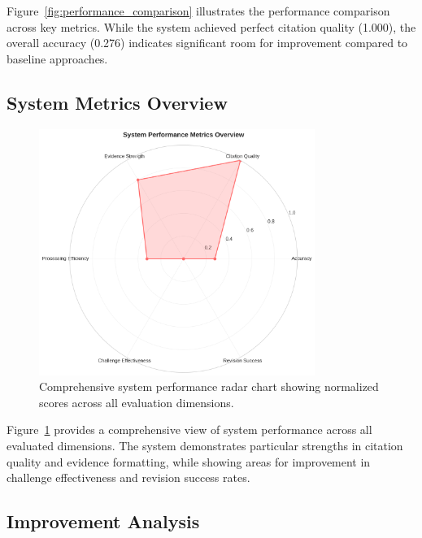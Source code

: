 \documentclass{article}
\begin{document}
Figure~\ref{fig:performance_comparison} illustrates the performance comparison across key metrics. While the system achieved perfect citation quality (1.000), the overall accuracy (0.276) indicates significant room for improvement compared to baseline approaches.

\subsection{System Metrics Overview}

\begin{figure}[htbp]
\centering
\includegraphics[width=0.8\textwidth]{figures/metrics_radar.png}
\caption{Comprehensive system performance radar chart showing normalized scores across all evaluation dimensions.}
\label{fig:metrics_radar}
\end{figure}

Figure~\ref{fig:metrics_radar} provides a comprehensive view of system performance across all evaluated dimensions. The system demonstrates particular strengths in citation quality and evidence formatting, while showing areas for improvement in challenge effectiveness and revision success rates.

\subsection{Improvement Analysis}
\end{document}
